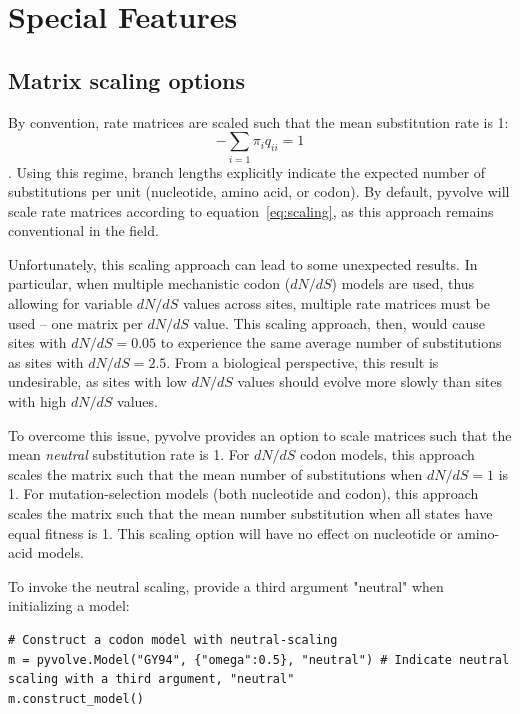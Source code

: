 \documentclass{article}
\begin{document}
\section{Special Features}\label{sec:special}

\subsection{Matrix scaling options}\label{sec:scaling}

By convention, rate matrices are scaled such that the mean substitution rate is 1:
\begin{equation}\label{eq:scaling}
- \sum_{i=1} \pi_iq_{ii} = 1
\end{equation}
 \citep{GY94,Yang1994}. Using this regime, branch lengths explicitly indicate the expected number of substitutions per unit (nucleotide, amino acid, or codon). By default, pyvolve will scale rate matrices according to equation~\ref{eq:scaling}, as this approach remains conventional in the field. 
 
Unfortunately, this scaling approach can lead to some unexpected results. In particular, when multiple mechanistic codon ($dN/dS$) models are used, thus allowing for variable $dN/dS$ values across sites, multiple rate matrices must be used -- one matrix per $dN/dS$ value. This scaling approach, then, would cause sites with $dN/dS = 0.05$ to experience the same average number of substitutions as sites with $dN/dS = 2.5$. From a biological perspective, this result is undesirable, as sites with low $dN/dS$ values should evolve more slowly than sites with high $dN/dS$ values.
 
To overcome this issue, pyvolve provides an option to scale matrices such that the mean \textit{neutral} substitution rate is 1. For $dN/dS$ codon models, this approach scales the matrix such that the mean number of substitutions when $dN/dS = 1$ is 1. For mutation-selection models (both nucleotide and codon), this approach scales the matrix such that the mean number substitution when all states have equal fitness is 1. This scaling option will have no effect on nucleotide or amino-acid models.

To invoke the neutral scaling, provide a third argument "neutral" when initializing a model:
\begin{lstlisting}
# Construct a codon model with neutral-scaling
m = pyvolve.Model("GY94", {"omega":0.5}, "neutral") # Indicate neutral scaling with a third argument, "neutral"
m.construct_model()
\end{lstlisting}
\end{document}

